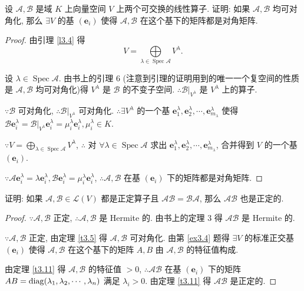 \documentclass{ctexart}
\begin{document}
\begin{exercise}\label{ex3.4}
    设 $\mathcal{A},\mathcal{B}$ 是域 $K$ 上向量空间 $V$ 上两个可交换的线性算子. 证明: 如果 $\mathcal{A},\mathcal{B}$ 均可对角化, 那么 $\exists V$ 的基 $(\boldsymbol{e}_i)$ 使得 $\mathcal{A},\mathcal{B}$ 在这个基下的矩阵都是对角矩阵.
\end{exercise}
\begin{proof}
    由引理 \ref{l3.4} 得
    \[V=\bigoplus\limits_{\lambda\in\operatorname{Spec}\mathcal{A}}V^\lambda.\]

    设 $\lambda\in\operatorname{Spec}\mathcal{A}$. 由书上的引理 6 (注意到引理的证明用到的唯一一个复空间的性质是 $\mathcal{A},\mathcal{B}$ 均可对角化)得 $V^\lambda$ 是 $\mathcal{B}$ 的不变子空间. $\therefore\mathcal{B}|_{V^\lambda}$ 是 $V^\lambda$ 上的算子.
    
    $\because\mathcal{B}$ 可对角化, $\therefore\mathcal{B}|_{V^\lambda}$ 可对角化. $\therefore\exists V^\lambda$ 的一个基 $\boldsymbol{e}^\lambda_1,\boldsymbol{e}^\lambda_2,\cdots,\boldsymbol{e}^\lambda_{m_\lambda}$ 使得 $\mathcal{B}\boldsymbol{e}^\lambda_i=\mathcal{B}|_{V^\lambda}\boldsymbol{e}^\lambda_i=\mu^\lambda_i\boldsymbol{e}^\lambda_i,\mu^\lambda_i\in K$.

    $\because V=\bigoplus\limits_{\lambda\in\operatorname{Spec}\mathcal{A}}V^\lambda$, $\therefore$ 对 $\forall\lambda\in\operatorname{Spec}\mathcal{A}$ 求出 $\boldsymbol{e}^\lambda_1,\boldsymbol{e}^\lambda_2,\cdots,\boldsymbol{e}^\lambda_{m_\lambda}$, 合并得到 $V$ 的一个基 $(\boldsymbol{e}_i)$.

    $\because\mathcal{A}\boldsymbol{e}^\lambda_i=\lambda\boldsymbol{e}^\lambda_i,\mathcal{B}\boldsymbol{e}^\lambda_i=\mu^\lambda_i\boldsymbol{e}^\lambda_i$, $\therefore\mathcal{A},\mathcal{B}$ 在基 $(\boldsymbol{e}_i)$ 下的矩阵都是对角矩阵.
\end{proof}
\begin{exercise}%
    证明: 如果 $\mathcal{A},\mathcal{B}\in\mathcal{L}(V)$ 都是正定算子且 $\mathcal{AB}=\mathcal{BA}$, 那么 $\mathcal{AB}$ 也是正定的.
\end{exercise}
\begin{proof}
    $\because\mathcal{A},\mathcal{B}$ 正定, $\therefore\mathcal{A},\mathcal{B}$ 是 Hermite 的. 由书上的定理 3 得 $\mathcal{AB}$ 是 Hermite 的.

    $\because\mathcal{A},\mathcal{B}$ 正定, 由定理 \ref{t3.5} 得 $\mathcal{A},\mathcal{B}$ 可对角化. 由第 \ref{ex3.4} 题得 $\exists V$ 的标准正交基 $(\boldsymbol{e}_i)$ 使得 $\mathcal{A},\mathcal{B}$ 在这个基下的矩阵 $A,B$ 由 $\mathcal{A},\mathcal{B}$ 的特征值构成.
    
    由定理 \ref{t3.11} 得 $\mathcal{A},\mathcal{B}$ 的特征值 $>0$, $\therefore\mathcal{AB}$ 在基 $(\boldsymbol{e}_i)$ 下的矩阵 $AB=\operatorname{diag} (\lambda_1,\lambda_2,\cdots,\lambda_n)$ 满足 $\lambda_i>0$. 由定理 \ref{t3.11} 得 $\mathcal{AB}$ 是正定的.
\end{proof}
\end{document}
